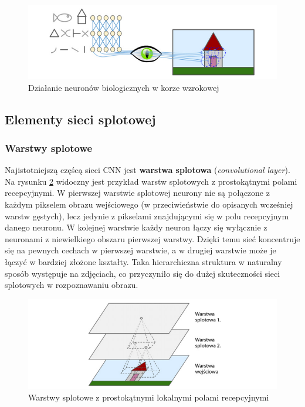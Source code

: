 \documentclass[12pt]{mwbk}
\theoremstyle{plain}
\theoremstyle{definition}
\theoremstyle{remark}
\newcommand\zrodlo[1]{\par\vspace{-3mm}{\small\textit{Źródło: }#1 }}
\begin{document}
\begin{figure}[!h]
	\centering
	\includegraphics[width=\linewidth]{rys/kora_wzrokowa.png}
	\caption{Działanie neuronów biologicznych w korze wzrokowej}
	\zrodlo{\cite{geron}}
	\label{fig:kora-wzrokowa}
\end{figure}

\subsection{Elementy sieci splotowej}

\subsubsection{Warstwy splotowe}

Najistotniejszą częścą sieci CNN jest \textbf{warstwa splotowa} (\emph{convolutional layer}). Na rysunku \ref{fig:warstwy-cnn} widoczny jest przykład warstw splotowych z prostokątnymi polami recepcyjnymi. W pierwszej warstwie splotowej neurony nie są połączone z każdym pikselem obrazu wejściowego (w przeciwieństwie do opisanych wcześniej warstw gęstych), lecz jedynie z pikselami znajdującymi się w polu recepcyjnym danego neuronu. W kolejnej warstwie każdy neuron łączy się wyłącznie z neuronami z niewielkiego obszaru pierwszej warstwy. Dzięki temu sieć koncentruje się na pewnych cechach w pierwszej warstwie, a w drugiej warstwie może je łączyć w bardziej złożone kształty. Taka hierarchiczna struktura w naturalny sposób występuje na zdjęciach, co przyczyniło się do dużej skuteczności sieci splotowych w rozpoznawaniu obrazu.

\begin{figure}[!h]
	\centering
	\includegraphics[width=\linewidth]{rys/warstwy_cnn.png}
	\caption{Warstwy splotowe z prostokątnymi lokalnymi polami recepcyjnymi}
	\zrodlo{\cite{geron}}
	\label{fig:warstwy-cnn}
\end{figure}
\end{document}
